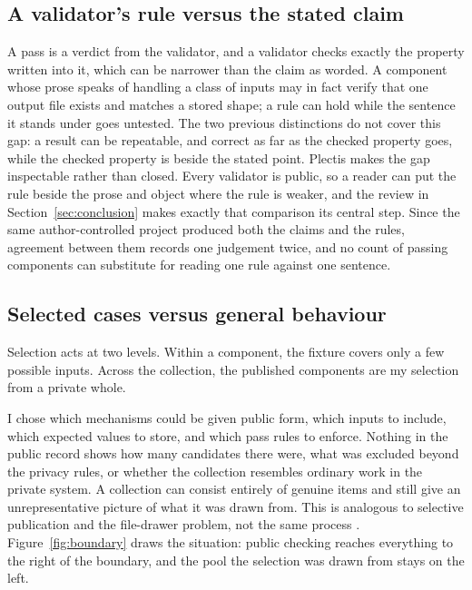 \documentclass[11pt]{article}
\begin{document}
\subsection*{A validator's rule versus the stated claim}

A pass is a verdict from the validator, and a validator checks exactly the
property written into it, which can be narrower than the claim as worded. A
component whose prose speaks of handling a class of inputs may in fact
verify that one output file exists and matches a stored shape; a rule can
hold while the sentence it stands under goes untested. The two previous
distinctions do not cover this gap: a result can be repeatable, and correct
as far as the checked property goes, while the checked property is beside
the stated point. Plectis makes the gap inspectable rather than closed.
Every validator is public, so a reader can put the rule beside the prose
and object where the rule is weaker, and the review in
Section~\ref{sec:conclusion} makes exactly that comparison its central step.
Since the same author-controlled project produced both the claims and the
rules, agreement between them records one judgement twice, and no count of
passing components can substitute for reading one rule against one sentence.

\subsection*{Selected cases versus general behaviour}

Selection acts at two levels. Within a component, the fixture covers only a
few possible inputs. Across the collection, the published components are my
selection from a private whole.

\begin{samepage}
I chose which mechanisms
could be given public form, which inputs to include, which expected values to
store, and which pass rules to enforce. Nothing in the public record shows
how many candidates there were, what was excluded beyond the privacy rules,
or whether the collection resembles ordinary work in the private system. A
collection can consist entirely of genuine items and still give an
unrepresentative picture of what it was drawn from. This is analogous to
selective publication and the file-drawer problem, not the same process
\cite[p.~638]{rosenthal1979}.
Figure~\ref{fig:boundary} draws the situation: public checking reaches
everything to the right of the boundary, and the pool the selection was
drawn from stays on the left.
\end{samepage}
\end{document}

